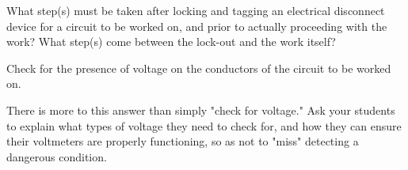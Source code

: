 

What step(s) must be taken after locking and tagging an electrical disconnect device for a circuit to be worked on, and prior to actually proceeding with the work?  What step(s) come between the lock-out and the work itself?







Check for the presence of voltage on the conductors of the circuit to be worked on.







There is more to this answer than simply "check for voltage."  Ask your students to explain what types of voltage they need to check for, and how they can ensure their voltmeters are properly functioning, so as not to "miss" detecting a dangerous condition.





